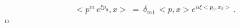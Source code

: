 \begin{equation} < p^m\,e^{\xi p_0} , x > \
= \ \delta_{m 1}\,< p , x > e^{\alpha \xi <p_0,x_0>}\,
.\label{424}\end{equation}o
